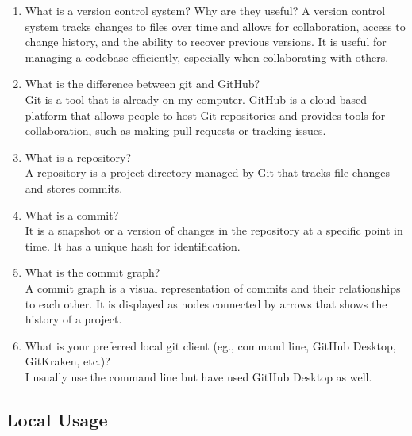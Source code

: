 \documentclass[10pt,twocolumn]{article}
\begin{document}
\begin{enumerate}
    \item What is a version control system? Why are they useful?
      A version control system tracks changes to files over time and allows for collaboration, access to change history, and the ability to recover previous versions. It is useful for managing a codebase efficiently, especially when collaborating with others.
    \item What is the difference between git and GitHub?
    \\
    Git is a tool that is already on my computer. GitHub is a cloud-based platform that allows people to host Git repositories and provides tools for collaboration, such as making pull requests or tracking issues.
    \item What is a repository?
    \\
    A repository is a project directory managed by Git that tracks file changes and stores commits.
    \item What is a commit?
    \\
    It is a snapshot or a version of changes in the repository at a specific point in time. It has a unique hash for identification.
    \item What is the commit graph?
    \\
    A commit graph is a visual representation of commits and their relationships to each other. It is displayed as nodes connected by arrows that shows the history of a project.
    \item What is your preferred local git client (eg., command line, GitHub Desktop, GitKraken, etc.)?
    \\
    I usually use the command line but have used GitHub Desktop as well.
\end{enumerate}

\subsection{Local Usage}
\end{document}
